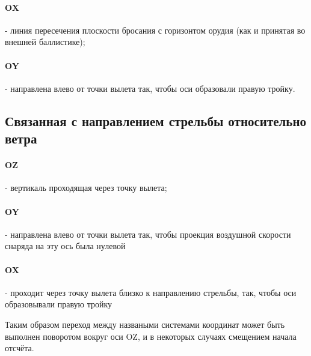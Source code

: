\paragraph{OX} - линия пересечения плоскости бросания с горизонтом орудия (как и принятая во внешней баллистике);
\paragraph{OY} - направлена влево от точки вылета так, чтобы оси образовали правую тройку.

\subsection{Связанная с направлением стрельбы относительно ветра}
\paragraph{OZ} - вертикаль проходящая через точку вылета;
\paragraph{OY} - направлена влево от точки вылета так, чтобы проекция воздушной скорости снаряда на эту ось была нулевой
\paragraph{OX} - проходит через точку вылета близко к направлению стрельбы, так, чтобы оси образовывали правую тройку

Таким образом переход между назваными системами координат может быть выполнен поворотом вокруг оси OZ, и в некоторых случаях смещением начала отсчёта.
